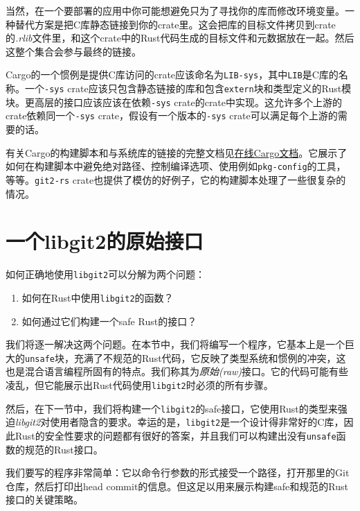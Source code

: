 当然，在一个要部署的应用中你可能想避免只为了寻找你的库而修改环境变量。一种替代方案是把C库静态链接到你的crate里。这会把库的目标文件拷贝到crate的\emph{.rlib}文件里，和这个crate中的Rust代码生成的目标文件和元数据放在一起。然后这整个集合会参与最终的链接。

Cargo的一个惯例是提供C库访问的crate应该命名为\texttt{LIB-sys}，其中\texttt{LIB}是C库的名称。一个\texttt{-sys} crate应该只包含静态链接的库和包含\texttt{extern}块和类型定义的Rust模块。更高层的接口应该应该在依赖\texttt{-sys} crate的crate中实现。这允许多个上游的crate依赖同一个\texttt{-sys} crate，假设有一个版本的\texttt{-sys} crate可以满足每个上游的需要的话。

有关Cargo的构建脚本和与系统库的链接的完整文档见\href{https://doc.rust-lang.org/cargo/reference/build-scripts.html}{在线Cargo文档}。它展示了如何在构建脚本中避免绝对路径、控制编译选项、使用例如\texttt{pkg-config}的工具，等等。\texttt{git2-rs} crate也提供了模仿的好例子，它的构建脚本处理了一些很复杂的情况。

\section{一个libgit2的原始接口}
如何正确地使用\texttt{libgit2}可以分解为两个问题：
\begin{enumerate}
    \item 如何在Rust中使用\texttt{libgit2}的函数？
    \item 如何通过它们构建一个safe Rust的接口？
\end{enumerate}

我们将逐一解决这两个问题。在本节中，我们将编写一个程序，它基本上是一个巨大的\texttt{unsafe}块，充满了不规范的Rust代码，它反映了类型系统和惯例的冲突，这也是混合语言编程所固有的特点。我们称其为\emph{原始(raw)}接口。它的代码可能有些凌乱，但它能展示出Rust代码使用\texttt{libgit2}时必须的所有步骤。

然后，在下一节中，我们将构建一个\texttt{libgit2}的safe接口，它使用Rust的类型来强迫\emph{libgit2}对使用者隐含的要求。幸运的是，\texttt{libgit2}是一个设计得非常好的C库，因此Rust的安全性要求的问题都有很好的答案，并且我们可以构建出没有\texttt{unsafe}函数的规范的Rust接口。

我们要写的程序非常简单：它以命令行参数的形式接受一个路径，打开那里的Git仓库，然后打印出head commit的信息。但这足以用来展示构建safe和规范的Rust接口的关键策略。

